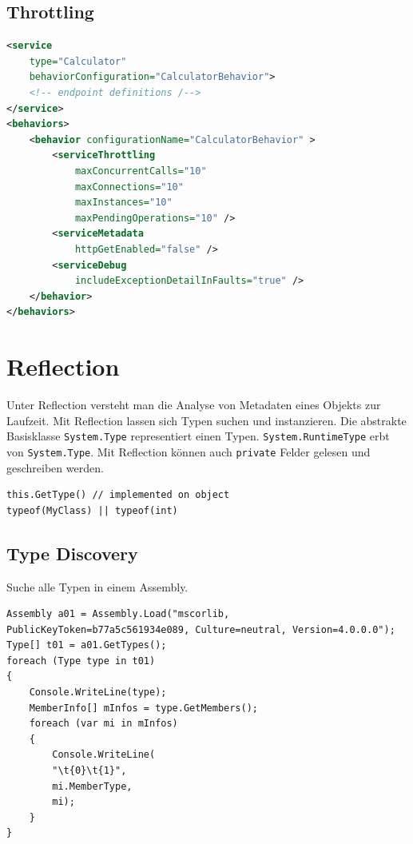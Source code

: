 \subsection{Throttling}
\begin{lstlisting}[caption=Service Throttling, language=XML]
<service
	type="Calculator"
	behaviorConfiguration="CalculatorBehavior">
	<!-- endpoint definitions /-->
</service>
<behaviors>
	<behavior configurationName="CalculatorBehavior" >
		<serviceThrottling
			maxConcurrentCalls="10"
			maxConnections="10"
			maxInstances="10"
			maxPendingOperations="10" />
		<serviceMetadata
			httpGetEnabled="false" />
		<serviceDebug
			includeExceptionDetailInFaults="true" />
	</behavior>
</behaviors>
\end{lstlisting}

\section{Reflection}
Unter Reflection versteht man die Analyse von Metadaten eines Objekts zur Laufzeit. Mit Reflection lassen sich Typen suchen und instanzieren. Die abstrakte Basisklasse \lstinline|System.Type| representiert einen Typen. \lstinline|System.RuntimeType| erbt von \lstinline|System.Type|. Mit Reflection können auch \lstinline|private| Felder gelesen und geschreiben werden.

\begin{lstlisting}[caption=Reflection]
this.GetType() // implemented on object
typeof(MyClass) || typeof(int)
\end{lstlisting}

\subsection{Type Discovery}
Suche alle Typen in einem Assembly.
\begin{lstlisting}[caption=Reflection: Type Discovery]
Assembly a01 = Assembly.Load("mscorlib, PublicKeyToken=b77a5c561934e089, Culture=neutral, Version=4.0.0.0");
Type[] t01 = a01.GetTypes();
foreach (Type type in t01)
{
	Console.WriteLine(type);
	MemberInfo[] mInfos = type.GetMembers();
	foreach (var mi in mInfos)
	{
		Console.WriteLine(
		"\t{0}\t{1}",
		mi.MemberType,
		mi);
	}
}
\end{lstlisting}



